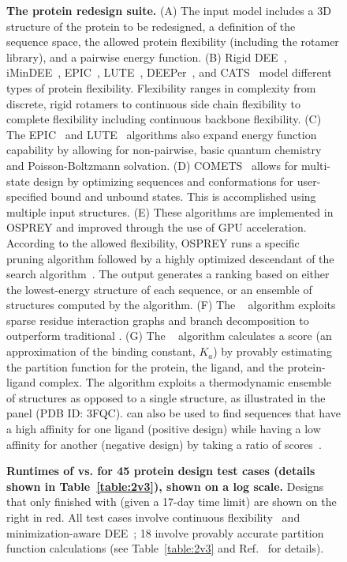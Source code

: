 
\begin{figure}
\caption{\textbf{The \osprey protein redesign suite.} (A) The input model includes a 3D structure of the protein to be redesigned, a definition of the sequence space, the allowed protein flexibility (including the rotamer library), and a pairwise energy function. (B) Rigid DEE~\cite{DEE,DEE/A*}, iMinDEE~\cite{iMinDEE}, EPIC~\cite{EPIC}, LUTE~\cite{LUTE_RECOMB}, DEEPer~\cite{DEEPer}, and CATS~\cite{CATS} model different types of protein flexibility. Flexibility ranges in complexity from discrete, rigid rotamers to continuous side chain flexibility to complete flexibility including continuous backbone flexibility. (C) The EPIC~\cite{EPIC} and LUTE~\cite{LUTE_RECOMB} algorithms also expand energy function capability by allowing for non-pairwise, basic quantum chemistry and Poisson-Boltzmann solvation. (D) COMETS~\cite{COMETS} allows for multi-state design by optimizing sequences and conformations for user-specified bound and unbound states. This is accomplished using multiple input structures. (E) These algorithms are implemented in OSPREY and improved through the use of GPU acceleration. According to the allowed flexibility, OSPREY runs a specific pruning algorithm followed by a highly optimized descendant of the \as search algorithm~\cite{dynamic_A*}. The \as output generates a ranking based on either the lowest-energy structure of each sequence, or an ensemble of structures computed by the \ks algorithm. (F) The \bwmstar~\cite{BWM*} algorithm exploits sparse residue interaction graphs and branch decomposition to outperform traditional \as. (G) The \ks~\cite{K*,minDEE} algorithm calculates a \ks score (an approximation of the binding constant, $K_a$) by provably estimating the partition function for the protein, the ligand, and the protein-ligand complex. The \ks algorithm exploits a thermodynamic ensemble of structures as opposed to a single structure, as illustrated in the panel (PDB ID: 3FQC). \ks can also be used to find sequences that have a high affinity for one ligand (positive design) while having a low affinity for another (negative design) by taking a ratio of \ks scores~\cite{DHFR-PNAS,DHFR-PNAS2}. }
\label{flowchart}
\end{figure}

\begin{figure}
\caption{\textbf{Runtimes of  vs.  for 45 protein design test cases (details shown in Table~\ref{table:2v3}), shown on a log scale.} Designs that only finished with  (given a 17-day time limit) are shown on the right in red.  All test cases involve continuous flexibility~\cite{minDEE,iMinDEE} and minimization-aware DEE~\cite{iMinDEE,EPIC}; 18 involve provably accurate partition function calculations (see Table~\ref{table:2v3} and Ref.~ for details).  }
\label{fig:2v3}
\end{figure}

